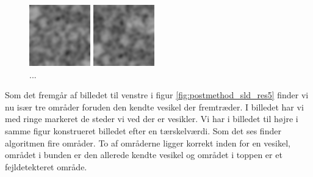 \begin{figure}[H]
	\begin{minipage}[b]{0.5\linewidth}
		\centering
		\includegraphics[scale=3]{files/postmethod/img/imTrain3.png}
	\end{minipage}
	\hspace{0.8cm}
	\begin{minipage}[b]{0.5\linewidth}
		\centering
		\includegraphics[scale=3]{files/postmethod/img/imTest5.png}
	\end{minipage}
	\caption{...\label{fig:postmethod_sld_res3}}
\end{figure}

Som det fremgår af billedet til venstre i figur \ref{fig:postmethod_sld_res5} finder vi nu især tre områder foruden den kendte vesikel der fremtræder. I billedet har vi med ringe markeret de steder vi ved der er vesikler. Vi har i billedet til højre i samme figur konstrueret billedet efter en tærskelværdi. Som det ses finder algoritmen fire områder. To af områderne ligger korrekt inden for en vesikel, området i bunden er den allerede kendte vesikel og området i toppen er et fejldetekteret område. 

